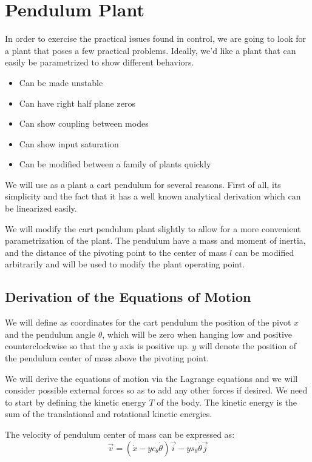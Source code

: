 \section{ Pendulum Plant}
In order to exercise the practical issues found in control, we are going to look for a plant that poses a few practical problems. Ideally, we'd like a plant that can easily be parametrized to show different behaviors.
\begin{itemize}
	\item Can be made unstable
	\item Can have right half plane zeros
	\item Can show coupling between modes
	\item Can show input saturation
	\item Can be modified between a family of plants quickly
\end{itemize}

We will use as a plant a cart pendulum for several reasons. First of all, its simplicity and the fact that it has a well known analytical derivation which can be linearized easily.

We will modify the cart pendulum plant slightly to allow for a more convenient parametrization of the plant. The pendulum have a mass and moment of inertia, and the distance of the pivoting point to the center of mass $l$ can be modified arbitrarily and will be used to modify the plant operating point.

\subsection{Derivation of the Equations of Motion}
We will define as coordinates for the cart pendulum the position of the pivot $x$ and the pendulum angle $\theta$, which will be zero when hanging low and positive counterclockwise so that the $y$ axis is positive up. $y$ will denote the position of the pendulum center of mass above the pivoting point.

We will derive the equations of motion via the Lagrange equations and we will consider possible external forces so as to add any other forces if desired. We need to start by defining the kinetic energy $T$ of the body. The kinetic energy is the sum of the translational and rotational kinetic energies.

The velocity of pendulum center of mass can be expressed as:
\begin{equation}
	\vec{v} = \left(\dot{x} - y c_\theta \dot{\theta} \right) \vec{i}
	         			    - y s_\theta \dot{\theta}         \vec{j}
\end{equation}

